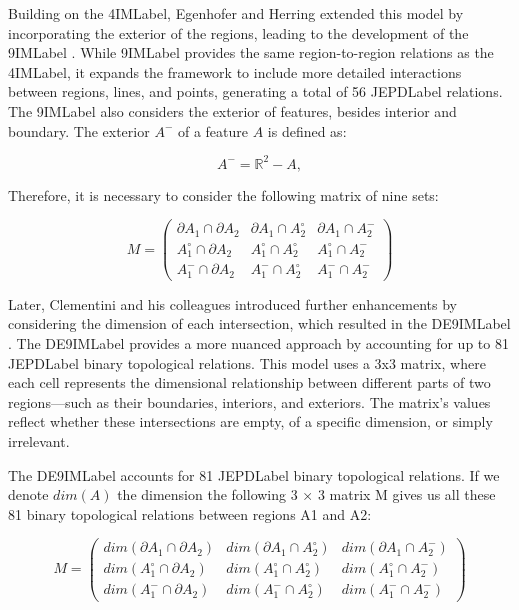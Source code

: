 Building on the \acrshort{4IMLabel}, Egenhofer and Herring extended this model by incorporating the exterior of the regions, leading to the development of the \acrfull{9IMLabel} \cite{egenhoferCategorizingBinaryTopological1991}. While \acrshort{9IMLabel} provides the same region-to-region relations as the \acrshort{4IMLabel}, it expands the framework to include more detailed interactions between regions, lines, and points, generating a total of 56 \acrshort{JEPDLabel} relations. The \acrshort{9IMLabel} also considers the exterior of features, besides interior and boundary. The exterior $A^{-}$ of a feature $A$ is defined as:

\begin{equation}
A^{-} = \mathbb{R}^2 - A,
\end{equation}

Therefore, it is necessary to consider the following matrix of nine sets:

\begin{equation}
M = 
\begin{pmatrix} 
\partial A_1 \cap \partial A_2 & \partial A_1 \cap A_2^{\circ}  & \partial A_1 \cap A_2^{-} \\ 
A_1^{\circ} \cap \partial A_2 & A_1^{\circ}  \cap A_2^{\circ}  & A_1^{\circ}  \cap A_2^{-} \\
A_1^{-} \cap \partial A_2 & A_1^{-} \cap A_2^{\circ}  & A_1^{-} \cap A_2^{-} 
\end{pmatrix}
\end{equation}


Later, Clementini and his colleagues introduced further enhancements by considering the dimension of each intersection, which resulted in the \acrfull{DE9IMLabel} \cite{clementiniSmallSetFormal1993, clementiniComparisonMethodsRepresenting1995a}. The \acrshort{DE9IMLabel} provides a more nuanced approach by accounting for up to 81 \acrshort{JEPDLabel} binary topological relations. This model uses a 3x3 matrix, where each cell represents the dimensional relationship between different parts of two regions—such as their boundaries, interiors, and exteriors. The matrix's values reflect whether these intersections are empty, of a specific dimension, or simply irrelevant.

The \acrshort{DE9IMLabel} accounts for 81 \acrshort{JEPDLabel} binary topological relations. If we denote  $dim(A)$ the dimension the following 3 × 3 matrix M gives us all these 81 binary topological relations between regions A1 and A2:

\begin{equation}
M = 
\begin{pmatrix} 
dim(\partial A_1 \cap \partial A_2) & dim(\partial A_1 \cap A_2^{\circ}) & dim(\partial A_1 \cap A_2^{-}) \\ 
dim(A_1^{\circ} \cap \partial A_2) & dim(A_1^{\circ}  \cap A_2^{\circ}) & dim(A_1^{\circ} \cap A_2^{-}) \\
dim(A_1^{-} \cap \partial A_2) & dim(A_1^{-} \cap A_2^{\circ}) & dim(A_1^{-} \cap A_2^{-})
\end{pmatrix}
\end{equation}

